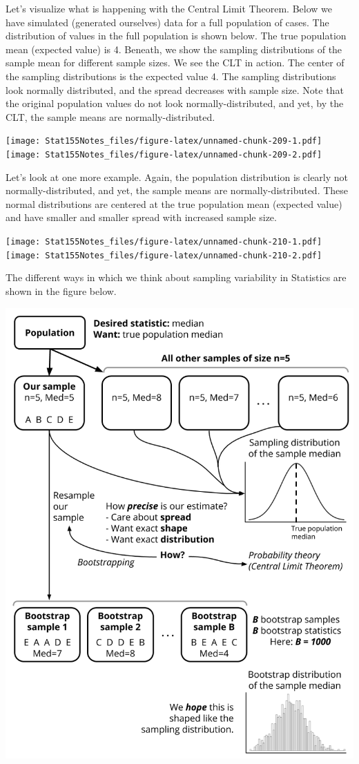 \documentclass[]{book}
\begin{document}
Let's visualize what is happening with the Central Limit Theorem. Below we have simulated (generated ourselves) data for a full population of cases. The distribution of values in the full population is shown below. The true population mean (expected value) is 4. Beneath, we show the sampling distributions of the sample mean for different sample sizes. We see the CLT in action. The center of the sampling distributions is the expected value 4. The sampling distributions look normally distributed, and the spread decreases with sample size. Note that the original population values do not look normally-distributed, and yet, by the CLT, the sample means are normally-distributed.

\texttt{[image: Stat155Notes\_files/figure-latex/unnamed-chunk-209-1.pdf]} \texttt{[image: Stat155Notes\_files/figure-latex/unnamed-chunk-209-2.pdf]}

Let's look at one more example. Again, the population distribution is clearly not normally-distributed, and yet, the sample means are normally-distributed. These normal distributions are centered at the true population mean (expected value) and have smaller and smaller spread with increased sample size.

\texttt{[image: Stat155Notes\_files/figure-latex/unnamed-chunk-210-1.pdf]} \texttt{[image: Stat155Notes\_files/figure-latex/unnamed-chunk-210-2.pdf]}

The different ways in which we think about sampling variability in Statistics are shown in the figure below.

\includegraphics{Photos/sampling_variation_flowchart.png}
\end{document}
